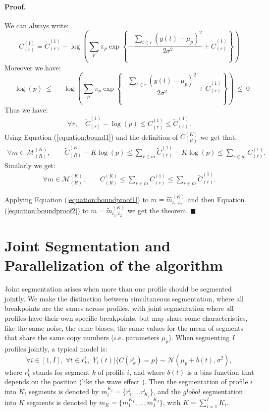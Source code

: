 \documentclass[11pt]{llncs}
\begin{document}
\paragraph{Proof.} 
We can always write:
$$ {C}_{(r)}^{(1)} = \widetilde{C}_{(r)}^{(1)} - \log\left(\sum_p \pi_p \exp \left\{ -\frac{\sum_{t \in r} (y(t)- \mu_p)^2 }{ 2 \sigma^2} +\widetilde{C}_{(r)}^{(1)} \right\}\right)$$
Moreover we have:
$$-\log(p) \ \leq \ 
- \log\left(\sum_p \pi_p \exp \left\{ -\frac{\sum_{t \in r} (y(t) - \mu_p)^2 }{ 2 \sigma^2} +\widetilde{C}_{(r)}^{(1)} \right\}\right)
\ \leq \  
0$$
Thus we have:
\begin{eqnarray}
\forall r,  \quad \widetilde{C}_{(r)}^{(1)} -\log(p) \leq {C}_{(r)}^{(1)} \leq \widetilde{C}_{(r)}^{(1)} \label{equation:bound1}.
\end{eqnarray}
Using Equation (\ref{equation:bound1}) and the definition of ${C}_{(R)}^{(K)}$ we get that, 
\begin{eqnarray} 
\forall m \in \mathcal{M}^{(K)}_{(R)}, \qquad
\widetilde{C}_{(R)}^{(K)} - K\log(p) \leq \sum_{r \in m} \widetilde{C}_{(r)}^{(1)} - K \log(p) \leq   \sum_{r \in m} {C}_{(r)}^{(1)} .
\label{equation:boundproof1}\end{eqnarray}
Similarly we get:
\begin{eqnarray} 
\forall m \in \mathcal{M}^{(K)}_{(R)}, \qquad
{C}_{(R)}^{(K)} \leq \sum_{r \in m} {C}_{(r)}^{(1)} \leq   \sum_{r \in m} \widetilde{C}_{(r)}^{(1)} .
\label{equation:boundproof2}\end{eqnarray}

Applying Equation (\ref{equation:boundproof1}) to $m = \widehat{m}_{t_1, t_2}^{(K)}$ and then Equation (\ref{equation:boundproof2})
to $m =  \widetilde{m}_{t_1, t_2}^{(K)}$ we get the theorem. $\blacksquare$

\section{Joint Segmentation and Parallelization of the algorithm}

Joint segmentation arises when more than one profile should be segmented jointly. We make the distinction between simultaneous segmentation, where all breakpoints are the sames across profiles, with joint segmentation where all profiles have their own specific breakpoints, but may share some characteristics, like the same noise, the same biases, the same values for the mean of segments that share the same copy numbers ($i.e.$ parameters $\mu_p$). When segmenting $I$ profiles jointly, a typical model is: 
$$
\forall i \in [1,I],\,\, \forall t \in r_k^i, \,\, Y_i(t)|\{C(r_k^i)=p\} \sim \mathcal{N}(\mu_p+b(t),\sigma^2),
$$
where ${r_k^i}$ stands for segment $k$ of profile $i$, and where $b(t)$ is a bias function that depends on the position (like the wave effect \cite{PLH11}). Then the segmentation of profile $i$ into $K_i$ segments is denoted by $m_{i}^{K_i}=\{r_1^i,...r_{K_i}^i\}$, and the $global$ segmentation into $K$ segments is denoted by $m_K=\{m_1^{K_1}, ..., m_{I}^{K_I}\}$, with $K=\sum_{i=1}^I K_i$.
\end{document}
